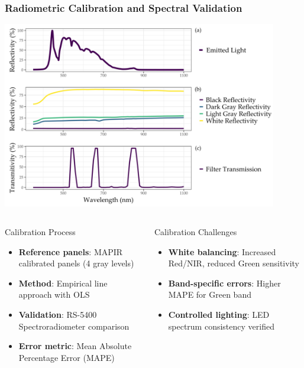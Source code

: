 \documentclass[aspectratio=43]{beamer}
\begin{document}
\begin{frame}
    \frametitle{Radiometric Calibration and Spectral Validation}
    
    \begin{center}
        \includegraphics[width=0.9\textwidth]{Imgs/agronomy-14-00306-g002.png}
    \end{center}
    
    \begin{columns}
        \begin{column}{0.5\textwidth}
            \begin{block}{Calibration Process}
                \scriptsize
                \begin{itemize}
                    \item \textbf{Reference panels}: MAPIR calibrated panels (4 gray levels)
                    \item \textbf{Method}: Empirical line approach with OLS
                    \item \textbf{Validation}: RS-5400 Spectroradiometer comparison
                    \item \textbf{Error metric}: Mean Absolute Percentage Error (MAPE)
                \end{itemize}
            \end{block}
        \end{column}
        
        \begin{column}{0.5\textwidth}
            \begin{alertblock}{Calibration Challenges}
                \scriptsize
                \begin{itemize}
                    \item \textbf{White balancing}: Increased Red/NIR, reduced Green sensitivity
                    \item \textbf{Band-specific errors}: Higher MAPE for Green band
                    \item \textbf{Controlled lighting}: LED spectrum consistency verified
                \end{itemize}
            \end{alertblock}
        \end{column}
    \end{columns}
\end{frame}
\end{document}
